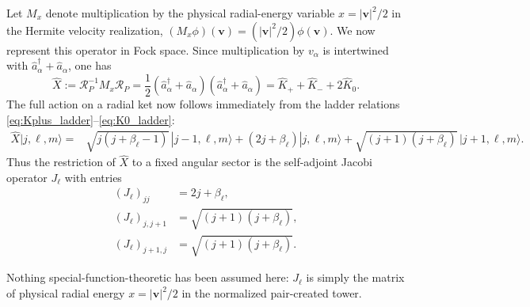 \documentclass[11pt]{article}
\numberwithin{equation}{section}
\theoremstyle{definition}
\begin{document}
Let $M_x$ denote multiplication by the physical radial-energy variable
$x=|\bm v|^2/2$ in the Hermite velocity realization,
$(M_x\phi)(\bm v)=(|\bm v|^2/2)\phi(\bm v)$.  We now represent this operator
in Fock space.  Since
multiplication by $v_\alpha$ is intertwined with
$\hat a_\alpha^\dagger+\hat a_\alpha$, one has
\begin{equation}
 \widehat X
 :=\mathcal R_P^{-1}M_x\mathcal R_P
 =\frac12
 (\hat a_\alpha^\dagger+\hat a_\alpha)
 (\hat a_\alpha^\dagger+\hat a_\alpha)
 =\widehat K_++\widehat K_-+2\widehat K_0.
 \label{eq:X_Fock}
\end{equation}
The full action on a radial ket now follows immediately from the ladder
relations \eqref{eq:Kplus_ladder}--\eqref{eq:K0_ladder}:
\begin{equation}
 \begin{aligned}
 \widehat X|j,\ell,m\rangle
 ={}&\sqrt{j(j+\beta_\ell-1)}\,|j-1,\ell,m\rangle
 +(2j+\beta_\ell)|j,\ell,m\rangle
+\sqrt{(j+1)(j+\beta_\ell)}\,|j+1,\ell,m\rangle .
 \end{aligned}
 \label{eq:J_action_full}
\end{equation}
Thus the restriction of $\widehat X$ to a fixed angular sector is the
self-adjoint Jacobi operator $J_\ell$ with entries
\begin{align}
 (J_\ell)_{jj}&=2j+\beta_\ell,
 \label{eq:Jdiag}
 \\
 (J_\ell)_{j,j+1}&=\sqrt{(j+1)(j+\beta_\ell)},
 \label{eq:Joff}
 \\
 (J_\ell)_{j+1,j}&=\sqrt{(j+1)(j+\beta_\ell)}.
\end{align}

Nothing special-function-theoretic
has been assumed here: $J_\ell$ is simply the matrix of physical radial
energy $x=|\bm v|^2/2$ in the normalized pair-created tower.
\end{document}
